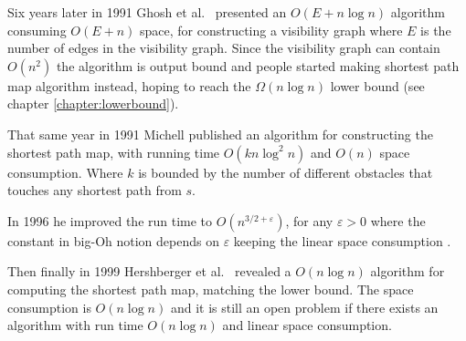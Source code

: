Six years later in 1991 Ghosh et al.\ \cite{GhoshM91} presented an $O(E+n\log n)$
algorithm consuming $O(E+n)$ space, for constructing a visibility graph where
$E$ is the number of edges in the visibility graph.
Since the visibility graph can contain $O(n^2)$ the algorithm is output bound
and people started making shortest path map algorithm instead, hoping to reach
the $\Omega{(n\log n)}$ lower bound (see chapter \ref{chapter:lowerbound}).

That same year in 1991 Michell \cite{DBLP:journals/amai/Mitchell91} published
an algorithm for constructing the shortest path map, with running time
$O(kn\log^2 n)$ and $O(n)$ space consumption. Where $k$ is bounded by the
number of different obstacles that touches any shortest path from $s$.

In 1996 he improved the run time to $O(n^{3/2+\varepsilon})$, for any
$\varepsilon>0$ where the constant in big-Oh notion depends on $\varepsilon$
keeping the linear space consumption  \cite{DBLP:journals/ijcga/Mitchell96}.

Then finally in 1999 Hershberger et al.\ \cite{HershbergerS99} revealed a
$O(n\log n)$ algorithm for computing the shortest path map, matching the lower
bound. The space consumption is $O(n\log n)$ and it is still an open problem if
there exists an algorithm with run time $O(n\log n)$ and linear space
consumption.


